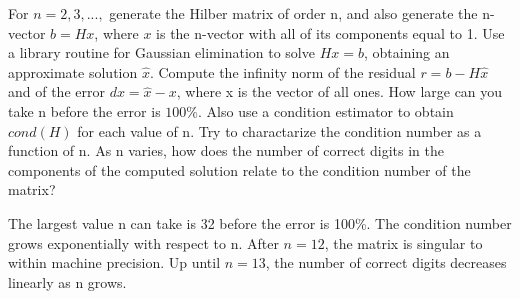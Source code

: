 \documentclass{jhwhw}
\begin{document}
For \(n = 2,3,...,\) generate the Hilber matrix of order n, and also
generate the n-vector \(b = Hx\), where \(x\) is the n-vector with all of its 
     components equal to 1. Use a library routine for Gaussian elimination
	 to solve \(Hx = b\), obtaining an approximate solution \(\hat{x}\). Compute
	 the infinity norm of the residual \(r = b - H\hat{x}\) and of the error
	 \(dx =  \hat{x} - x\), where x is the vector of all ones. How large can
	 you take n before the error is \(100\%\). Also use a condition estimator to
	 obtain \(cond(H)\) for each value of n. Try to charactarize the condition 
     number as a function of n. As n varies, how does the number of correct
     digits in the components of the computed solution relate to the condition
     number of the matrix?
\solution

The largest value n can take is 32 before the error is 100\%. 
The condition number grows exponentially with respect to n. After \(n=12\), 
the matrix is singular to within machine precision. Up until \(n=13\), the number 
of correct digits decreases linearly as n grows.
\end{document}
